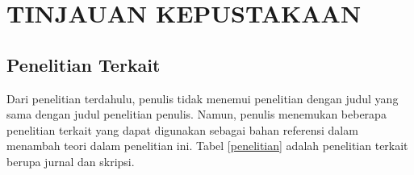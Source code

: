
\chapter{TINJAUAN KEPUSTAKAAN}  

\section{Penelitian Terkait}              
Dari penelitian terdahulu, penulis tidak menemui penelitian dengan judul yang sama dengan judul penelitian penulis. Namun, penulis menemukan beberapa penelitian terkait yang dapat digunakan sebagai bahan referensi dalam menambah teori dalam penelitian ini. Tabel \ref{penelitian} adalah penelitian terkait berupa jurnal dan skripsi. 

